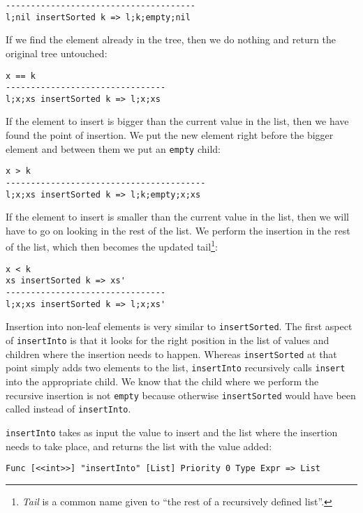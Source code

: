 \begin{lstlisting}
--------------------------------------
l;nil insertSorted k => l;k;empty;nil
\end{lstlisting}

If we find the element already in the tree, then we do nothing and return the original tree untouched:

\begin{lstlisting}
x == k
--------------------------------
l;x;xs insertSorted k => l;x;xs
\end{lstlisting}

If the element to insert is bigger than the current value in the list, then we have found the point of insertion. We put the new element right before the bigger element and between them we put an \texttt{empty} child:

\begin{lstlisting}
x > k
----------------------------------------
l;x;xs insertSorted k => l;k;empty;x;xs
\end{lstlisting}

If the element to insert is smaller than the current value in the list, then we will have to go on looking in the rest of the list. We perform the insertion in the rest of the list, which then becomes the updated tail\footnote{\textit{Tail} is a common name given to ``the rest of a recursively defined list''.}:

\begin{lstlisting}
x < k
xs insertSorted k => xs'
--------------------------------
l;x;xs insertSorted k => l;x;xs'
\end{lstlisting}


Insertion into non-leaf elements is very similar to \texttt{insertSorted}. The first aspect of \texttt{insertInto} is that it looks for the right position in the list of values and children where the insertion needs to happen. Whereas \texttt{insertSorted} at that point simply adds two elements to the list, \texttt{insertInto} recursively calls \texttt{insert} into the appropriate child. We know that the child where we perform the recursive insertion is not \texttt{empty} because otherwise \texttt{insertSorted} would have been called instead of \texttt{insertInto}.

\texttt{insertInto} takes as input the value to insert and the list where the insertion needs to take place, and returns the list with the value added:

\begin{lstlisting}
Func [<<int>>] "insertInto" [List] Priority 0 Type Expr => List
\end{lstlisting}

